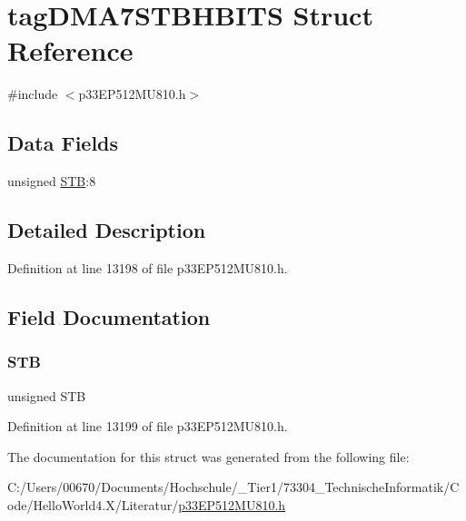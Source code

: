 \hypertarget{structtag_d_m_a7_s_t_b_h_b_i_t_s}{}\section{tag\+D\+M\+A7\+S\+T\+B\+H\+B\+I\+TS Struct Reference}
\label{structtag_d_m_a7_s_t_b_h_b_i_t_s}


{\ttfamily \#include $<$p33\+E\+P512\+M\+U810.\+h$>$}

\subsection*{Data Fields}
\begin{DoxyCompactItemize}
\item 
unsigned \hyperlink{structtag_d_m_a7_s_t_b_h_b_i_t_s_a9bd043a4db27e09b5035a563a8758fe7}{S\+TB}\+:8
\end{DoxyCompactItemize}


\subsection{Detailed Description}


Definition at line 13198 of file p33\+E\+P512\+M\+U810.\+h.



\subsection{Field Documentation}
\mbox{\label{structtag_d_m_a7_s_t_b_h_b_i_t_s_a9bd043a4db27e09b5035a563a8758fe7}} 
\subsubsection{\texorpdfstring{S\+TB}{STB}}
{\footnotesize\ttfamily unsigned S\+TB}



Definition at line 13199 of file p33\+E\+P512\+M\+U810.\+h.



The documentation for this struct was generated from the following file\+:\begin{DoxyCompactItemize}
\item 
C\+:/\+Users/00670/\+Documents/\+Hochschule/\+\_\+\+Tier1/73304\+\_\+\+Technische\+Informatik/\+Code/\+Hello\+World4.\+X/\+Literatur/\hyperlink{p33_e_p512_m_u810_8h}{p33\+E\+P512\+M\+U810.\+h}\end{DoxyCompactItemize}
